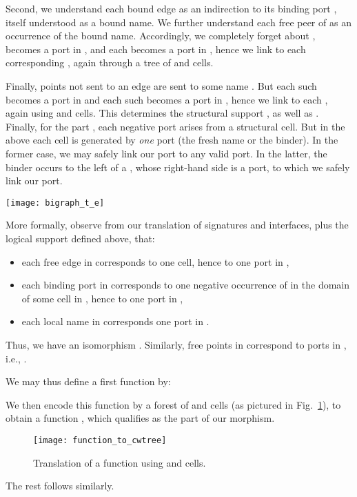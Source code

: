 \documentclass{llncs}
\begin{document}
Second, we understand each bound edge  as an indirection to its
binding port , itself understood as a bound name. We
further understand each free peer  of  as an
occurrence of the bound name.  Accordingly, we completely forget about
,  becomes a  port in , and each 
becomes a  port in , hence we link  to each
corresponding , again through a tree of  and  cells.

Finally, points  not sent to an edge are sent to some name .  But each such  becomes a  port in  and each
such  becomes a  port in , hence we link  to each
, again using  and  cells.  This determines the structural
support , as well as .  Finally, for the  part , each
negative  port arises from a structural  cell. But in
the above each cell is generated by \emph{one}  port (the fresh
name or the binder). In the former case, we may safely link our 
port to any valid  port. In the latter, the binder occurs to the
left of a , whose right-hand side is a  port, to which we
safely link our  port.

\begin{figure*}[t]\centering
    \texttt{[image: bigraph\_t\_e]}
    \caption{Translation of .}
    \label{bigraph:t_e}
\end{figure*}

More formally, observe from our translation of signatures and
interfaces, plus the logical support  defined above, that:\begin{itemize}
\item each free edge in  corresponds to one  cell,
  hence to one port in ,
\item each binding port in  corresponds to one negative
  occurrence of  in the domain of some cell in , hence to one
  port in ,
\item each local name in  corresponds  
  one port in .
\end{itemize}
Thus, we have an isomorphism .
Similarly, free points in  correspond to ports in , i.e., .

We may thus define a first function  by:


We then encode this function by a forest of  and  cells  (as
pictured in Fig.~\ref{function_to_cwtree}), to obtain a function
, which qualifies as the  part of our morphism. \begin{figure}[ht]\centering
    \texttt{[image: function\_to\_cwtree]}
    \caption{Translation of a function using  and  cells.}
    \label{function_to_cwtree}
\end{figure}The rest follows similarly.
\end{document}
